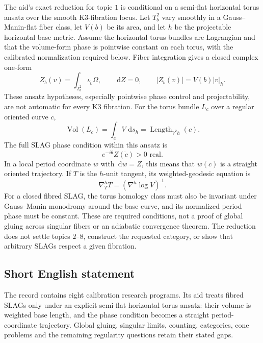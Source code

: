 \documentclass[11pt]{article}
\newcommand{\dd}{\,\mathrm{d}}
\begin{document}
The aid's exact reduction for topic \(1\) is conditional on a semi-flat horizontal torus ansatz over the smooth K3-fibration locus. Let \(T_b^2\) vary smoothly in a Gauss--Manin-flat fiber class, let \(V(b)\) be its area, and let \(h\) be the projectable horizontal base metric. Assume the horizontal torus bundles are Lagrangian and that the volume-form phase is pointwise constant on each torus, with the calibrated normalization required below. Fiber integration gives a closed complex one-form
\[
 Z_b(v)=\int_{T_b^2}\iota_{\widetilde v}\Omega,\qquad
 \dd Z=0,\qquad |Z_b(v)|=V(b)|v|_h.
\]
These ansatz hypotheses, especially pointwise phase control and projectability, are not automatic for every K3 fibration. For the torus bundle \(L_c\) over a regular oriented curve \(c\),
\[
 \operatorname{Vol}(L_c)=\int_c V\,\dd s_h
       =\operatorname{Length}_{V^2h}(c).
\]
The full SLAG phase condition within this ansatz is
\[
 e^{-i\theta}Z(\dot c)>0\text{ real}.
\]
In a local period coordinate \(w\) with \(\dd w=Z\), this means that \(w(c)\) is a straight oriented trajectory. If \(T\) is the \(h\)-unit tangent, its weighted-geodesic equation is
\[
 \nabla^h_TT=(\nabla^h\log V)^\perp.
\]
For a closed fibred SLAG, the torus homology class must also be invariant under Gauss--Manin monodromy around the base curve, and its normalized period phase must be constant. These are required conditions, not a proof of global gluing across singular fibers or an adiabatic convergence theorem. The reduction does not settle topics \(2\)--\(8\), construct the requested category, or show that arbitrary SLAGs respect a given fibration.
\subsection{Short English statement}
The record contains eight calibration research programs. Its aid treats fibred SLAGs only under an explicit semi-flat horizontal torus ansatz: their volume is weighted base length, and the phase condition becomes a straight period-coordinate trajectory. Global gluing, singular limits, counting, categories, cone problems and the remaining regularity questions retain their stated gaps.
\end{document}
